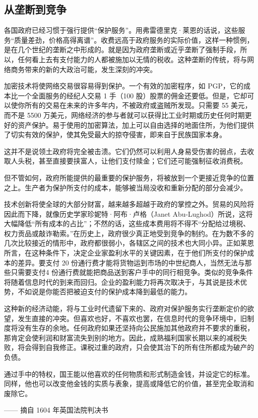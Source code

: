 \subsection{从垄断到竞争}
各国政府已经习惯于强行提供“保护服务”。用弗雷德里克·莱恩的话说，这些服务“质量差劲，价格高得离谱”。收费远高于政府服务的实际价值，这样一种惯例，是在几个世纪的垄断之中形成的。就是因为政府垄断或近乎垄断了强制手段，所以，任何看上去有支付能力的人都被施加以无情的税收。这种垄断的传统，将与网络商务带来的新的大政治可能，发生深刻的冲突。

加密技术将使网络交易很容易得到保护。一个有效的加密程序，如 PGP，它的成本比一个全面服务的经纪人交易 1 手（100 股）股票的佣金还要低。但是，它却可以使你所有的交易在未来的许多年内，不被政府或盗贼所发现。只需要 55 美元，而不是 5500 万美元，网络经济的参与者就可以获得比工业时期或历史任何时期更好的资产保护。易于使用的加密算法，加上可以自由选择的地面住所，为他们提供了切实有效的保护，使其免受最大的掠夺侵害，即来自于民族国家本身。

这并不是说领土政府将完全被击溃。它们仍然可以利用人身易受伤害的弱点，去收取人头税，甚至直接要挟富人，让他们支付赎金；它们还可能强制征收消费税。

但不管如何，政府所能提供的最重要的保护服务，将被放到一个更接近竞争的位置之上。生产者为保护所支付的成本，能够被当局没收和重新分配的部分会减少。

技术创新将使全球的大部分财富，越来越多超越于政府的掌控之外。贸易的风险将因此而下降，就像历史学家珍妮特·阿布·卢格（Janet Abu-Lughod）所说，这将大幅降低“所有成本的占比”；不然的话，这些成本费用将不得不“分配给过境税、权力贡品或敲诈勒索。”在历史上，政府很少真正地受到竞争的制约。在为数不多的几次比较接近的情形中，政府都很弱小，各辖区之间的技术也大同小异。正如莱恩所言，在这种条件下，决定企业家盈利水平的关键因素，在于他们所支付的保护成本的差异。要支付 20 份通行费才能将货物运到市场的中世纪商人，当然无法与那些只需要支付4 份通行费就能把商品送到客户手中的同行相竞争。类似的竞争条件将随着信息时代的到来而回归。企业的盈利能力将再次取决于，与其说是技术优势，不如说是你能否把被迫支付的保护成本降到最低的能力。

这种新的经济动能，将与工业时代遗留下来的、政府对保护服务实行垄断定价的欲望，发生直接的冲突。但喜欢也好，不喜欢也罢，在信息时代的竞争环境中，旧制度将没有生存的余地。任何政府如果还坚持向公民施加其他政府并不要求的重税，那肯定会使利润和财富流失到别的地方。因此，成熟福利国家长期以来的减税失败，将会得到自我修正。课税过重的政府，只会使其治下的所有住所都成为破产的负债。

\begin{tcolorbox}
通过手中的特权，国王能以他喜欢的任何物质和形式制造金钱，并设定它的标准。同样，他也可以改变他金钱的实质与表象，提高或降低它的价值，甚至完全取消和废除它。
\begin{flushright}
—— 摘自 1604 年英国法院判决书  
\end{flushright}
\end{tcolorbox}

